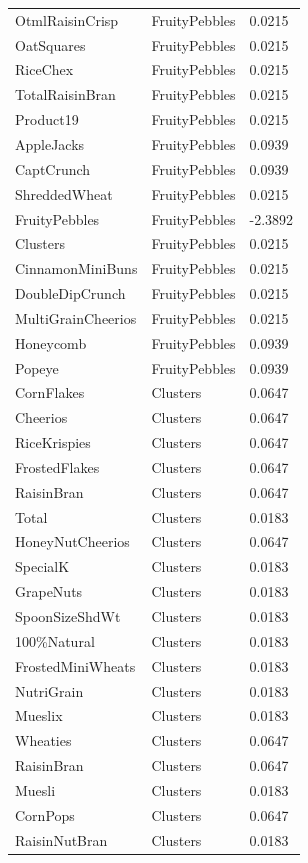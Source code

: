 \begin{table}[!htbp]
\begin{tabular}{lll}
OtmlRaisinCrisp & FruityPebbles & 0.0215
\\
OatSquares & FruityPebbles & 0.0215
\\
RiceChex & FruityPebbles & 0.0215
\\
TotalRaisinBran & FruityPebbles & 0.0215
\\
Product19 & FruityPebbles & 0.0215
\\
AppleJacks & FruityPebbles & 0.0939
\\
CaptCrunch & FruityPebbles & 0.0939
\\
ShreddedWheat & FruityPebbles & 0.0215
\\
FruityPebbles & FruityPebbles & -2.3892
\\
Clusters & FruityPebbles & 0.0215
\\
CinnamonMiniBuns & FruityPebbles & 0.0215
\\
DoubleDipCrunch & FruityPebbles & 0.0215
\\
MultiGrainCheerios & FruityPebbles & 0.0215
\\
Honeycomb & FruityPebbles & 0.0939
\\
Popeye & FruityPebbles & 0.0939
\\
CornFlakes & Clusters & 0.0647
\\
Cheerios & Clusters & 0.0647
\\
RiceKrispies & Clusters & 0.0647
\\
FrostedFlakes & Clusters & 0.0647
\\
RaisinBran & Clusters & 0.0647
\\
Total & Clusters & 0.0183
\\
HoneyNutCheerios & Clusters & 0.0647
\\
SpecialK & Clusters & 0.0183
\\
GrapeNuts & Clusters & 0.0183
\\
SpoonSizeShdWt & Clusters & 0.0183
\\
100\%Natural & Clusters & 0.0183
\\
FrostedMiniWheats & Clusters & 0.0183
\\
NutriGrain & Clusters & 0.0183
\\
Mueslix & Clusters & 0.0183
\\
Wheaties & Clusters & 0.0647
\\
RaisinBran & Clusters & 0.0647
\\
Muesli & Clusters & 0.0183
\\
CornPops & Clusters & 0.0647
\\
RaisinNutBran & Clusters & 0.0183
\\

\end{tabular}
\end{table}
